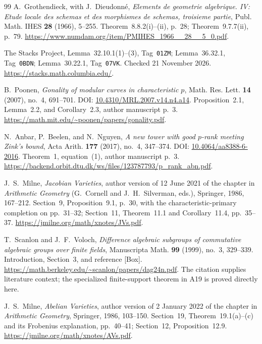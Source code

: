 \documentclass[11pt,a4paper]{article}
\begin{document}
\begin{thebibliography}{99}
A.~Grothendieck, with J.~Dieudonn\'e, \emph{Elements de geometrie
algebrique. IV: Etude locale des schemas et des morphismes de
schemas, troisieme partie}, Publ. Math. IHES \textbf{28} (1966),
5--255. Theorem~8.8.2(i)--(ii), p.~28; Theorem~9.7.7(ii), p.~79.
\url{https://www.numdam.org/item/PMIHES_1966__28__5_0.pdf}.

The Stacks Project, Lemma~32.10.1(1)--(3), Tag~\texttt{01ZM};
Lemma~36.32.1, Tag~\texttt{0BDN}; Lemma~30.22.1,
Tag~\texttt{07VK}. Checked 21 November 2026.
\url{https://stacks.math.columbia.edu/}.

B.~Poonen,
\emph{Gonality of modular curves in characteristic $p$},
Math. Res. Lett. \textbf{14} (2007), no.~4, 691--701.
DOI: \href{https://doi.org/10.4310/MRL.2007.v14.n4.a14}{10.4310/MRL.2007.v14.n4.a14}.
Proposition~2.1, Lemma~2.2, and Corollary~2.3, author manuscript p.~3.
\url{https://math.mit.edu/~poonen/papers/gonality.pdf}.

N.~Anbar, P.~Beelen, and N.~Nguyen,
\emph{A new tower with good $p$-rank meeting Zink's bound},
Acta Arith. \textbf{177} (2017), no.~4, 347--374.
DOI: \href{https://doi.org/10.4064/aa8388-6-2016}{10.4064/aa8388-6-2016}.
Theorem~1, equation~(1), author manuscript p.~3.
\url{https://backend.orbit.dtu.dk/ws/files/123787793/p_rank_abn.pdf}.

J.~S.~Milne, \emph{Jacobian Varieties}, author version of
12 June 2021 of the chapter in \emph{Arithmetic Geometry}
(G.~Cornell and J.~H.~Silverman, eds.), Springer, 1986, 167--212.
Section~9, Proposition~9.1, p.~30, with the characteristic-primary
completion on pp.~31--32; Section~11, Theorem~11.1 and
Corollary~11.4, pp.~35--37.
\url{https://jmilne.org/math/xnotes/JVs.pdf}.

T.~Scanlon and J.~F.~Voloch,
\emph{Difference algebraic subgroups of commutative algebraic
groups over finite fields},
Manuscripta Math. \textbf{99} (1999), no.~3, 329--339.
Introduction, Section~3, and reference \textnormal{[Box]}.
\url{https://math.berkeley.edu/~scanlon/papers/dag24n.pdf}.
The citation supplies literature context; the specialized
finite-support theorem in A19 is proved directly here.


J.~S.~Milne, \emph{Abelian Varieties}, author version of
2 January 2022 of the chapter in \emph{Arithmetic Geometry},
Springer, 1986, 103--150.
Section~19, Theorem~19.1(a)--(c) and its Frobenius explanation,
pp.~40--41; Section~12, Proposition~12.9.
\url{https://jmilne.org/math/xnotes/AVs.pdf}.



\end{thebibliography}
\end{document}

